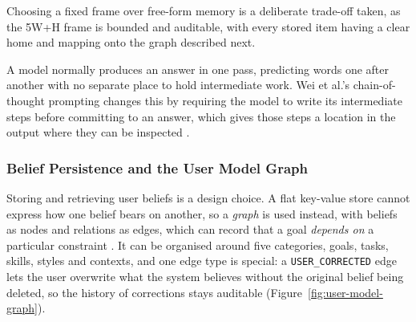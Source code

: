 Choosing a fixed frame over free-form memory is a deliberate trade-off taken, as the 5W+H frame is bounded and auditable, with every stored item having a clear home and mapping onto the graph described next. 

A model normally produces an answer in one pass, predicting words one after another with no separate place to hold intermediate work. Wei et al.'s chain-of-thought prompting changes this by requiring the model to write its intermediate steps before committing to an answer, which gives those steps a location in the output where they can be inspected \cite{wei2023chainofthoughtpromptingelicitsreasoning}. 

\subsubsection{Belief Persistence and the User Model Graph}
\label{subsec:belief-persistence-and-the-user-model-graph}

Storing and retrieving user beliefs is a design choice. A flat key-value store cannot express how one belief bears on another, so a \emph{graph} is used instead, with beliefs as nodes and relations as edges, which can record that a goal \emph{depends on} a particular constraint \cite{wang2026memmachinegroundtruthpreservingmemorypersonalized, yang2026graphbasedagentmemorytaxonomy}. It can be organised around five categories, goals, tasks, skills, styles and contexts, and one edge type is special: a \texttt{USER\_CORRECTED} edge lets the user overwrite what the system believes without the original belief being deleted, so the history of corrections stays auditable (Figure~\ref{fig:user-model-graph}).

